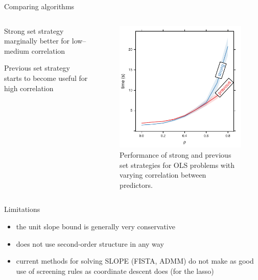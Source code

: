 \documentclass[10pt,ignorenonframetext]{beamer}
\begin{document}
\begin{frame}{Comparing algorithms}
  \begin{columns}
    \begin{column}{0.45\linewidth}
      Strong set strategy marginally better for low--medium correlation\medskip

      Previous set strategy starts to become useful for high correlation
    \end{column}
    \begin{column}{0.45\linewidth}
      \begin{figure}
        \centering
        \includegraphics[width=\textwidth]{figures/algorithms.pdf}
        \caption{Performance of strong and previous set strategies for
          OLS problems with varying correlation between predictors.}
      \end{figure}
    \end{column}
  \end{columns}
\end{frame}

\begin{frame}{Limitations}
  \begin{itemize}
    \item the unit slope bound is generally very conservative
    \item does not use second-order structure in any way
    \item current methods for solving SLOPE (FISTA, ADMM) do not make as good use of screening rules
          as coordinate descent does (for the lasso)
  \end{itemize}
\end{frame}
\end{document}
